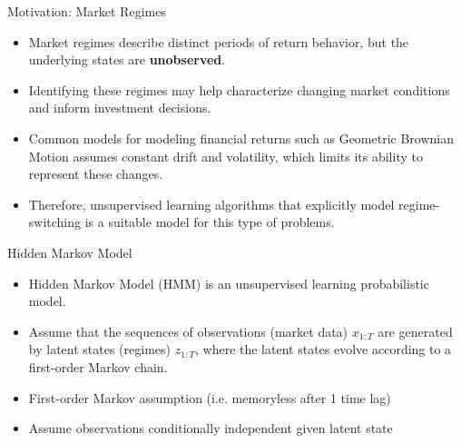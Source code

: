 

\begin{frame}{Motivation: Market Regimes}
\begin{itemize}
\item Market regimes describe distinct periods of return behavior, but the underlying states are \textbf{unobserved}.
\item Identifying these regimes may help characterize changing market conditions and inform investment decisions.
\item Common models for modeling financial returns such as Geometric Brownian Motion assumes constant drift and volatility, which limits its ability to represent these changes.
\item Therefore, unsupervised learning algorithms that explicitly model regime-switching is a suitable model for this type of problems.
\end{itemize}
\end{frame}

\begin{frame}{Hidden Markov Model}
\begin{itemize}
    \item Hidden Markov Model (HMM) is an unsupervised learning probabilistic model. 
    \item Assume that the sequences of observations (market data) $x_{1:T}$ are generated by latent states (regimes) $z_{1:T}$, where the latent states evolve according to a first-order Markov chain. \cite{rabiner1989}
    \item First-order Markov assumption (i.e. memoryless after 1 time lag)
    \item Assume observations conditionally independent given latent state
\end{itemize}

\end{frame}

